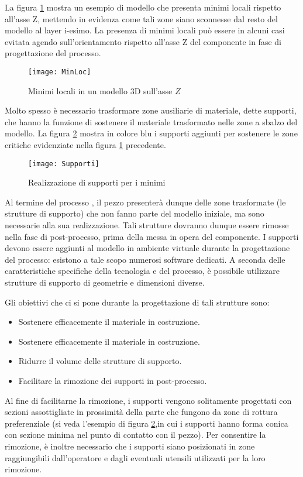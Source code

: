 La figura \ref{fig:MinLoc} mostra un esempio di modello che presenta minimi locali rispetto all'asse Z, mettendo in evidenza come tali zone siano sconnesse dal resto del modello al layer i-esimo.
La presenza di minimi locali può essere in alcuni casi evitata agendo sull'orientamento rispetto all'asse Z del componente in fase di progettazione del processo.
\begin{figure}
\centering
\texttt{[image: MinLoc]}
\caption{Minimi locali in un modello 3D sull'asse $Z$}
\label{fig:MinLoc}
\end{figure}

Molto spesso è necessario trasformare zone ausiliarie di materiale, dette supporti, che hanno la funzione di sostenere il materiale trasformato nelle zone a sbalzo del modello. 
La figura \ref{fig:Supporti} mostra in colore blu i supporti aggiunti per sostenere le zone critiche evidenziate nella figura \ref{fig:MinLoc} precedente.

\begin{figure}
\centering
\texttt{[image: Supporti]}
\caption{Realizzazione di supporti per i minimi}
\label{fig:Supporti}
\end{figure}

Al termine del processo , il pezzo presenterà dunque delle zone trasformate (le strutture di supporto) che non fanno parte del modello iniziale, ma sono necessarie alla sua realizzazione. Tali strutture dovranno dunque essere rimosse nella fase di post-processo, prima della messa in opera del componente.
I supporti devono essere aggiunti al modello in ambiente virtuale durante la progettazione del processo: esistono a tale scopo numerosi software dedicati.
A seconda delle caratteristiche specifiche della tecnologia e del processo, è possibile utilizzare strutture di supporto di geometrie e dimensioni diverse.

Gli obiettivi che ci si pone durante la progettazione di tali strutture sono:
\begin{itemize}
\item Sostenere efficacemente il materiale in costruzione.
\item Sostenere efficacemente il materiale in costruzione.
\item Ridurre il volume delle strutture di supporto.
\item Facilitare la rimozione dei supporti in post-processo.
\end{itemize}

Al fine di facilitarne la rimozione, i supporti vengono solitamente progettati con sezioni assottigliate in prossimità della parte che fungono da zone di rottura preferenziale (si veda l'esempio di figura \ref{fig:Supporti},in cui i supporti hanno forma conica con sezione minima nel punto di contatto con il pezzo).
Per consentire la rimozione, è inoltre necessario che i supporti siano posizionati in zone raggiungibili dall'operatore e dagli eventuali utensili utilizzati per la loro rimozione.

